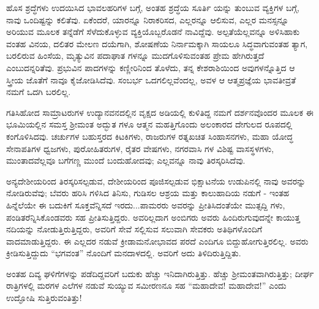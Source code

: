 ಹೊಸ ಶ್ರದ್ಧೆಗಳು ಉದಯಿಸಿದ ಭಾವಲಹರಿಗಳ ಬಗ್ಗೆ, ಅಂತಹ ಶ್ರದ್ಧೆಯ ಸೂರ್ತಿ ಯನ್ನು ತುಂಬುವ ವ್ಯಕ್ತಿಗಳ ಬಗ್ಗೆ, ನಾವು ಒಂದಿಷ್ಟನ್ನು ಕಲಿತೆವು. ಏಕೆಂದರೆ, ಯಾರನ್ನೂ ನಿರಾಕರಿಸದ, ಎಲ್ಲರನ್ನೂ ಆಲಿಸುವ, ಎಲ್ಲರ ಮನಸ್ಸನ್ನೂ ಅರಿಯುವ ಮೂಲಕ ತನ್ನೆಡೆಗೆ ಸೆಳೆದುಕೊಳ್ಳುವ ವ್ಯಕ್ತಿಯೊಬ್ಬರೊಡನೆ ನಾವಿದ್ದೆವು. ಅಲ್ಪತೆಯೆಲ್ಲವನ್ನೂ ಅಳಿಸಿಹಾಕು ವಂತಹ ವಿನಯ, ದಲಿತರ ಮೇಲಣ ದಯೆಗಾಗಿ, ಶೋಷಣೆಯ ನಿರ್ನಾಮಕ್ಕಾಗಿ ಸಾಯಲೂ ಸಿದ್ಧವಾಗುವಂತಹ ತ್ಯಾಗ, ಬರಲಿರುವ ಹಿಂಸೆಯ, ಮೃತ್ಯುವಿನ ಪದಾಘಾತ ಗಳನ್ನೂ ಮುದಗೊಳಿಸುವಂತಹ ಪ್ರೇಮ ಹೇಗಿರುತ್ತದೆ ಎಂಬುದನ್ನರಿತೆವು. ಪ್ರಭುವಿನ ಪಾದಗಳನ್ನು ಕಣ್ಣೀರಿನಿಂದ ತೊಳೆದು, ತನ್ನ ಕೇಶರಾಶಿಯಿಂದ ಅವುಗಳನ್ನೊತ್ತಿದ ಆ ಸ್ತ್ರೀಯ ಜೊತೆಗೆ ನಾವೂ ಕೈಜೋಡಿಸಿದೆವು. ಸಂಬರ್ಭ ಒದಗಲಿಲ್ಲವೆಂದಲ್ಲ, ಅವಳ ಆ ಆತ್ಮಪ್ರಜ್ಞೆಯ ಭಾವತೀವ್ರತೆ ನಮಗೆ ಒದಗಿ ಬರಲಿಲ್ಲ.

ಗತಿಸಿಹೋದ ಸಾಮ್ರಾಟರುಗಳ ಉದ್ಯಾನವನದಲ್ಲಿನ ವೃಕ್ಷದ ಅಡಿಯಲ್ಲಿ ಕುಳಿತಿದ್ದ ನಮಗೆ ದರ್ಶನವೊಂದರ ಮೂಲಕ ಈ ಭೂಮಿಯಲ್ಲಿನ ಸಮಸ್ತ ಶ‍್ರೀಮಂತ ಅದ್ಭುತ ಗಳೂ ಆತ್ಮನ ಮಹತ್ತಿಗೊಂದು ಅಲಂಕಾರದ ದೇಗುಲದ ರೂಪದಲ್ಲಿ ಕಂಗೊಳಿಸಿದವು. ಚರ್ಚುಗಳ ಬಹುಸ್ತರದ ಕಿಟಕಿಗಳು, ರಾಜರುಗಳ ರತ್ನಖಚಿತ ಸಿಂಹಾಸನಗಳು, ಮಹಾ ಯೋದ್ಧ ಸೇನಾಪತಿಗಳ ಧ್ವಜಗಳು, ಪುರೋಹಿತರುಗಳ, ರೈತರ ವೇಷಗಳು, ನಗರವಾಸಿ ಗಳ ವಿಶಿಷ್ಟ ವಾಸಸ್ಥಳಗಳು, ಮುಂತಾದವೆಲ್ಲವೂ ಬಗೆಗಣ್ಣ ಮುಂದೆ ಬಂದುಹೋದವು; ಎಲ್ಲವನ್ನೂ ನಾವು ತಿರಸ್ಕರಿಸಿದೆವು.

ಅನ್ಯದೇಶೀಯರಿಂದ ತಿರಸ್ಕರಿಸಲ್ಪಡುವ, ದೇಶೀಯರಿಂದ ಪೂಜಿಸಲ್ಪಡುವ ಭಿಕ್ಷಾಟನೆಯ ಉಡುಪಿನಲ್ಲಿ ನಾವು ಅವರನ್ನು ನೋಡಿರುವೆವು; ಬೆವರು ಹರಿಸಿ ಗಳಿಸಿದ ತಿನಿಸು, ಗುಡಿಸಲ ಆಶ್ರಯ ಮತ್ತು ಕಾಲುಹಾದಿಯ ನಡುಗೆ - ಇಂತಹ ಹಿನ್ನೆಲೆಯೇ ಈ ಬದುಕಿಗೆ ಸೂಕ್ತವೆನ್ನಿಸದೆ ಇರದು...ಪಾಮರರು ಅವರನ್ನು ಪ್ರೀತಿಸಿದಂತೆಯೇ ಮುತ್ಸದ್ದಿ ಗಳು, ಪಂಡಿತರೆನ್ನಿಸಿಕೊಂಡವರು ಸಹ ಪ್ರೀತಿಸುತ್ತಿದ್ದರು. ಅವರಿಲ್ಲದಾಗ ಅಂಬಿಗರು ಅವರು ಹಿಂದಿರುಗುವುದನ್ನೇ ಕಾಯುತ್ತ ನದಿಯನ್ನು ನೋಡುತ್ತಿರುತ್ತಿದ್ದರು, ಅವರಿಗೆ ಸೇವೆ ಸಲ್ಲಿಸುವ ಸಲುವಾಗಿ ಸೇವಕರು ಅತಿಥಿಗಳೊಂದಿಗೆ ವಾದಮಾಡುತ್ತಿದ್ದರು. ಈ ಎಲ್ಲದರ ನಡುವೆ ಕ್ರೀಡಾಮನೋಭಾವದ ಪರದೆ ಎಂದಿಗೂ ಬಿದ್ದುಹೋಗುತ್ತಿರಲಿಲ್ಲ. ಅವರು ಕ್ರೀಡಿಸುತ್ತಿದ್ದುದು “ಭಗವಂತ” ನೊಂದಿಗೆ ಮನದಾಳದಲ್ಲಿ. ಅವರಿಗೆ ಅದು ತಿಳಿದಿರುತ್ತಿದ್ದಿತು.

ಅಂತಹ ದಿವ್ಯ ಘಳಿಗೆಗಳನ್ನು ಪಡೆದಿದ್ದವರಿಗೆ ಬದುಕು ಹೆಚ್ಚು ಇನಿದಾಗಿರುತ್ತಿತ್ತು. ಹೆಚ್ಚು ಶ‍್ರೀಮಂತವಾಗಿರುತ್ತಿತ್ತು; ದೀರ್ಘ ರಾತ್ರಿಗಳಲ್ಲಿ ಮರಗಳ ಎಲೆಗಳ ನಡುವೆ ಸುಯ್ಯುವ ಸಮೀರಣನೂ ಸಹ “ಮಹಾದೇವ! ಮಹಾದೇವ!” ಎಂದು ಉದ್ಘೋಷಿ ಸುತ್ತಿರುವಂತಿತ್ತು!

